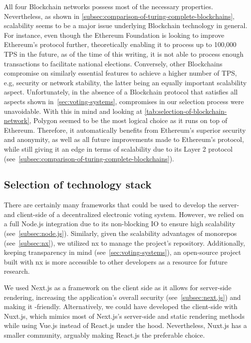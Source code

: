 All four \gls{Blockchain} networks possess most of the necessary properties.
Nevertheless, as shown in \cref{subsec:comparison-of-turing-complete-blockchains}, scalability seems to be a major issue underlying \gls{Blockchain} technology in general.
For instance, even though the Ethereum Foundation is looking to improve Ethereum's protocol further, theoretically enabling it to process up to 100,000 \gls{TPS} in the future, as of the time of this writing, it is not able to process enough transactions to facilitate national elections.
Conversely, other \glspl{Blockchain} compromise on similarly essential features to achieve a higher number of \gls{TPS}, e.g, security or network stability, the latter being an equally important scalability aspect.
Unfortunately, in the absence of a \gls{Blockchain} protocol that satisfies all aspects shown in~\cref{sec:voting-systems}, compromises in our selection process were unavoidable.
With this in mind and looking at \cref{tab:selection-of-blockchain-network}, Polygon seemed to be the most logical choice as it runs on top of Ethereum.
Therefore, it automatically benefits from Ethereum's superior security and anonymity, as well as all future improvements made to Ethereum's protocol, while still giving it an edge in terms of scalability due to its Layer 2 protocol (see~\cref{subsec:comparison-of-turing-complete-blockchains}).

\subsection{Selection of technology stack}\label{subsec:selection-of-tech-stack}

There are certainly many frameworks that could be used to develop the server- and client-side of a decentralized electronic voting system.
However, we relied on a full Node.js integration due to its non-blocking \gls{IO} to ensure high scalability (see~\cref{subsec:node.js}).
Similarly, given the scalability advantages of monorepos (see~\cref{subsec:nx}), we utilized nx to manage the project's repository.
Additionally, keeping transparency in mind (see~\cref{sec:voting-systems}), an open-source project built with nx is more accessible to other developers as a resource for future research.

We used Next.js as a framework on the client side as it allows for server-side rendering, increasing the application's overall security (see~\cref{subsec:next.js}) and making it -friendly.
Alternatively, we could have developed the client-side with Nuxt.js, which mimics most of Next.js's server-side and static rendering methods while using Vue.js instead of React.js under the hood.
Nevertheless, Nuxt.js has a smaller community, arguably making React.js the preferable choice.

